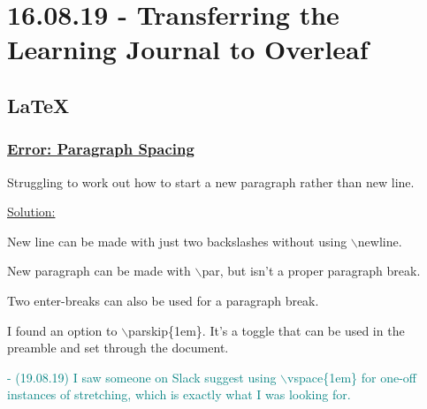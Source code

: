 \documentclass[12pt]{article}
\begin{document}

\newpage\section{16.08.19 - Transferring the Learning Journal to Overleaf}

\subsection{LaTeX}
\subsubsection{\underline{Error: Paragraph Spacing}}\label{error:er6}
\begin{addmargin}[1cm]{0cm}
Struggling to work out how to start a new paragraph rather than new line. 

\underline{Solution:}

New line can be made with just two backslashes without using $\backslash$newline.

New paragraph can be made with $\backslash$par, but isn't a proper paragraph break.

Two enter-breaks can also be used for a paragraph break.

I found an option to $\backslash$parskip\{1em\}. It's a toggle that can be used in the preamble and set through the document.

\textcolor{teal}{- (19.08.19) I saw someone on Slack suggest using $\backslash$vspace\{1em\} for one-off instances of stretching, which is exactly what I was looking for.}


\end{addmargin}
\end{document}
